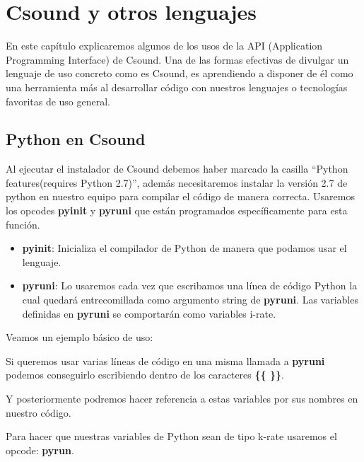 
\chapter{Csound y otros lenguajes}

En este capítulo explicaremos algunos de los usos de la API (Application Programming Interface) de Csound. Una de las formas efectivas de divulgar un lenguaje de uso concreto como es Csound, es aprendiendo a disponer de él como una herramienta más al desarrollar código con nuestros lenguajes o tecnologías favoritas de uso general.

\section{Python en  Csound}

Al ejecutar el instalador de Csound debemos haber marcado la casilla ``Python features(requires Python 2.7)'', además necesitaremos instalar la versión 2.7 de python en nuestro equipo para compilar el código de manera correcta. Usaremos los opcodes \textbf{pyinit} y \textbf{pyruni} que están programados específicamente para esta función.

\begin{itemize}
 \item \textbf{pyinit}: Inicializa el compilador de Python de manera que podamos usar el lenguaje.
 \item \textbf{pyruni}: Lo usaremos cada vez que escribamos una línea de código Python la cual quedará entrecomillada como argumento string de \textbf{pyruni}. Las variables definidas en \textbf{pyruni} se comportarán como variables i-rate.
\end{itemize}

Veamos un ejemplo básico de uso:


Si queremos usar varias líneas de código en una misma llamada a \textbf{pyruni} podemos conseguirlo escribiendo dentro de los caracteres \textbf{\{\{ \}\}}.


Y posteriormente podremos hacer referencia a estas variables por sus nombres en nuestro código.

Para hacer que nuestras variables de Python sean de tipo k-rate usaremos el opcode: \textbf{pyrun}.

